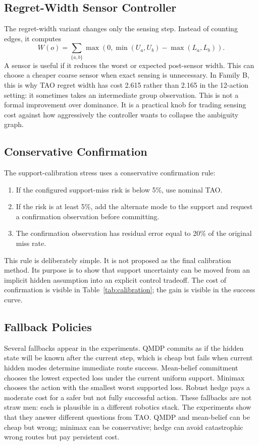 \documentclass{article}
\begin{document}
\subsection{Regret-Width Sensor Controller}

The regret-width variant changes only the sensing step. Instead of counting edges, it computes
\[
  W(o)=\sum_{\{a,b\}} \max(0,\min(U_a,U_b)-\max(L_a,L_b)).
\]
A sensor is useful if it reduces the worst or expected post-sensor width. This can choose a cheaper coarse sensor when exact sensing is unnecessary. In Family B, this is why TAO regret width has cost 2.615 rather than 2.165 in the 12-action setting: it sometimes takes an intermediate group observation. This is not a formal improvement over dominance. It is a practical knob for trading sensing cost against how aggressively the controller wants to collapse the ambiguity graph.

\subsection{Conservative Confirmation}

The support-calibration stress uses a conservative confirmation rule:
\begin{enumerate}
  \item If the configured support-miss risk is below 5\%, use nominal TAO.
  \item If the risk is at least 5\%, add the alternate mode to the support and request a confirmation observation before committing.
  \item The confirmation observation has residual error equal to 20\% of the original miss rate.
\end{enumerate}
This rule is deliberately simple. It is not proposed as the final calibration method. Its purpose is to show that support uncertainty can be moved from an implicit hidden assumption into an explicit control tradeoff. The cost of confirmation is visible in Table~\ref{tab:calibration}; the gain is visible in the success curve.

\subsection{Fallback Policies}

Several fallbacks appear in the experiments. QMDP commits as if the hidden state will be known after the current step, which is cheap but fails when current hidden modes determine immediate route success. Mean-belief commitment chooses the lowest expected loss under the current uniform support. Minimax chooses the action with the smallest worst supported loss. Robust hedge pays a moderate cost for a safer but not fully successful action. These fallbacks are not straw men: each is plausible in a different robotics stack. The experiments show that they answer different questions from TAO. QMDP and mean-belief can be cheap but wrong; minimax can be conservative; hedge can avoid catastrophic wrong routes but pay persistent cost.
\end{document}
